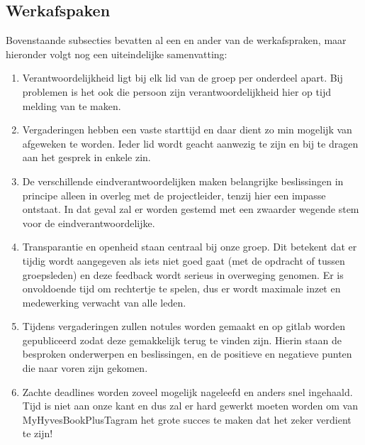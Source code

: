 \documentclass{uva-inf-article}
\begin{document}
\subsection{Werkafspaken}
Bovenstaande subsecties bevatten al een en ander van de werkafspraken, maar hieronder volgt nog een uiteindelijke samenvatting:

\begin{enumerate}
\item Verantwoordelijkheid ligt bij elk lid van de groep per onderdeel apart.
Bij problemen is het ook die persoon zijn verantwoordelijkheid hier op tijd melding van te maken.
\item Vergaderingen hebben een vaste starttijd en daar dient zo min mogelijk van afgeweken te worden. Ieder lid wordt geacht aanwezig te zijn en bij te dragen aan het gesprek in enkele zin.
\item De verschillende eindverantwoordelijken maken belangrijke beslissingen in principe alleen in overleg met de projectleider, tenzij hier een impasse ontstaat. In dat geval zal er worden gestemd met een zwaarder wegende stem voor de eindverantwoordelijke.
\item Transparantie en openheid staan centraal bij onze groep. Dit betekent dat er tijdig wordt aangegeven als iets niet goed gaat (met de opdracht of tussen groepsleden) en deze feedback wordt serieus in overweging genomen. Er is onvoldoende tijd om rechtertje te spelen, dus er wordt maximale inzet en medewerking verwacht van alle leden.
\item Tijdens vergaderingen zullen notules worden gemaakt en op gitlab worden gepubliceerd zodat deze gemakkelijk terug te vinden zijn. Hierin staan de besproken onderwerpen en beslissingen, en de positieve en negatieve punten die naar voren zijn gekomen.
\item Zachte deadlines worden zoveel mogelijk nageleefd en anders snel ingehaald. Tijd is niet aan onze kant en dus zal er hard gewerkt moeten worden om van MyHyvesBookPlusTagram het grote succes te maken dat het zeker verdient te zijn!
\end{enumerate}






\end{document}
